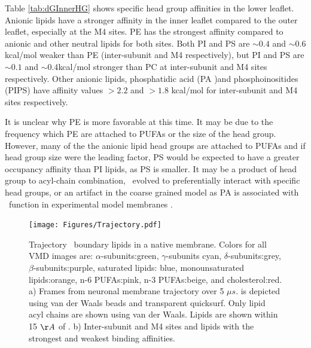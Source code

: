 Table \ref{tab:dGInnerHG} shows specific head group affinities in the lower leaflet. Anionic lipids have a stronger affinity in the inner leaflet compared to the outer leaflet, especially at the M4 sites. PE has the strongest affinity compared to anionic and other neutral lipids for both sites. Both PI and PS are $\sim 0.4 $ and $\sim 0.6$ kcal/mol weaker than PE (inter-subunit and M4 respectively), but PI and PS are $\sim 0.1$ and $\sim0.4$kcal/mol stronger than PC at inter-subunit and M4 sites respectively. Other anionic lipids, phosphatidic acid  (PA )and phosphoinositides (PIPS) have affinity values $>2.2$ and $>1.8$ kcal/mol for inter-subunit and M4 sites respectively.


It is unclear why PE is more favorable at this time. It may be due to the frequency which PE are attached to PUFAs or the size of the head group.  However, many of the the anionic lipid head groups are attached to PUFAs and if head group size were the leading factor, PS would be expected to have a greater occupancy affinity than PI lipids, as PS is smaller. It may be a product of head group to acyl-chain combination, \nachr~evolved to preferentially interact with specific head groups, or an artifact in the coarse grained model as PA is associated with \nachr~function in experimental model membranes \citep{Hamouda2006a,Cheng2007,Hung2011}. %

 \begin{figure}
	\center
	\texttt{[image: Figures/Trajectory.pdf]}

	\caption[Trajectory of \nachr~boundary lipids in a native membrane.] {Trajectory \nachr~boundary lipids in a native membrane. Colors for all VMD images are: $\alpha$-subunits:green, $\gamma$-subunits cyan, $\delta$-subunits:grey, $\beta$-subunits:purple, saturated lipids: blue, monounsaturated lipids:orange, n-6 PUFAs:pink, n-3 PUFAs:beige, and cholesterol:red. a) Frames from neuronal membrane trajectory over 5 $\mu s$. \nachr is depicted using van der Waals beads and transparent quicksurf. Only lipid acyl chains are shown using van der Waals. Lipids are shown within 15 $\AA$ of \nachr. b) Inter-subunit and M4 sites and lipids with the strongest and weakest binding affinities. }
	\label{fig:trj}
\end{figure}

